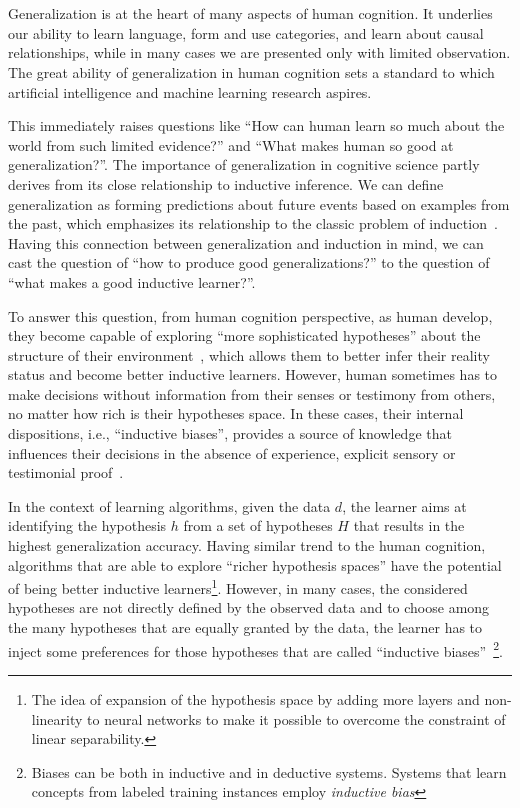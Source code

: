\part{}
\label{part3}
Generalization is at the heart of many aspects of human cognition. It underlies our ability to learn language, form and use categories, and learn about causal relationships, while in many cases we are presented only with limited observation. The great ability of generalization in human cognition sets a standard to which artificial intelligence and machine learning research aspires.

This immediately raises questions like ``How can human learn so much about the world from such limited evidence?'' and ``What makes human so good at generalization?''.
The importance of generalization in cognitive science partly derives
from its close relationship to inductive inference.  We can define generalization as forming predictions about future events based on examples from the past, which emphasizes its relationship to the classic problem of induction~\citep{hume2003treatise}. 
Having this connection between generalization and induction in mind, we can cast the question of ``how to produce good generalizations?'' to the question of ``what makes a good inductive learner?''.

To answer this question, from human cognition perspective, as human develop, they become capable of exploring ``more sophisticated hypotheses'' about the structure of their environment~\citep{inhelder1958growth}, which allows them to better infer their reality status and become better inductive learners. However, human sometimes has to make decisions without information from their senses or testimony from others, no matter how rich is their hypotheses space.
In these cases, their internal dispositions, i.e., ``inductive biases'', provides a source of knowledge that influences their decisions in the absence of experience, explicit sensory or testimonial proof~\cite{sodian1987children,griffiths2010probabilistic}.

In the context of learning algorithms, given the data $d$, the learner aims at identifying the hypothesis $h$ from a set of hypotheses $H$ that results in the highest generalization accuracy.  Having similar trend to the human cognition, algorithms that are able to explore ``richer hypothesis spaces'' have the potential of being better inductive learners\footnote{The idea of expansion of the hypothesis space by adding more layers and non-linearity to neural networks to make it possible to overcome the constraint of linear separability.}. However, in many cases, the considered hypotheses are not directly defined by the observed data and to choose among the many hypotheses that are equally granted by the data, the learner has to inject some preferences for those hypotheses that are called ``inductive biases''~\footnote{Biases can be both in inductive and in deductive systems. Systems that learn concepts from labeled training instances employ \emph{inductive bias}}. 

